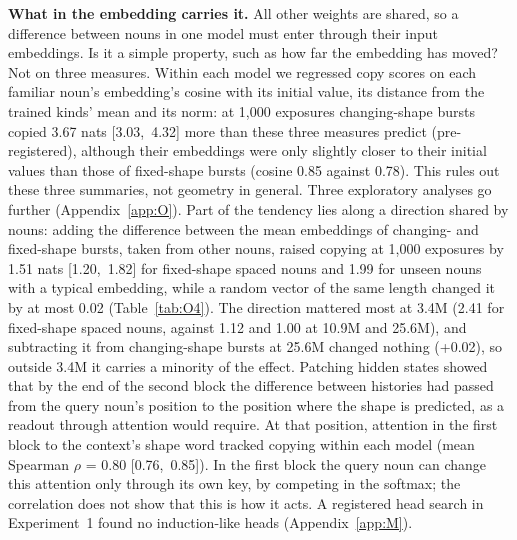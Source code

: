 \documentclass{article}
\begin{document}
\textbf{What in the embedding carries it.} All other weights are shared, so a difference between nouns in one model must enter through their input embeddings. Is it a simple property, such as how far the embedding has moved? Not on three measures. Within each model we regressed copy scores on each familiar noun's embedding's cosine with its initial value, its distance from the trained kinds' mean and its norm: at 1,000 exposures changing-shape bursts copied 3.67 nats [3.03,~4.32] more than these three measures predict (pre-registered), although their embeddings were only slightly closer to their initial values than those of fixed-shape bursts (cosine 0.85 against 0.78). This rules out these three summaries, not geometry in general. Three exploratory analyses go further (Appendix~\ref{app:O}). Part of the tendency lies along a direction shared by nouns: adding the difference between the mean embeddings of changing- and fixed-shape bursts, taken from other nouns, raised copying at 1,000 exposures by 1.51 nats [1.20,~1.82] for fixed-shape spaced nouns and 1.99 for unseen nouns with a typical embedding, while a random vector of the same length changed it by at most 0.02 (Table~\ref{tab:O4}). The direction mattered most at 3.4M (2.41 for fixed-shape spaced nouns, against 1.12 and 1.00 at 10.9M and 25.6M), and subtracting it from changing-shape bursts at 25.6M changed nothing (+0.02), so outside 3.4M it carries a minority of the effect. Patching hidden states \citep{zhang2024patching} showed that by the end of the second block the difference between histories had passed from the query noun's position to the position where the shape is predicted, as a readout through attention would require. At that position, attention in the first block to the context's shape word tracked copying within each model (mean Spearman $\rho$ = 0.80 [0.76,~0.85]). In the first block the query noun can change this attention only through its own key, by competing in the softmax; the correlation does not show that this is how it acts. A registered head search in Experiment~1 found no induction-like heads (Appendix~\ref{app:M}).

\begin{table}[!t]
\centering\small


\caption{Experiment 3, steering (exploratory): copy score with the noun's own embedding (baseline; typical embedding for unseen nouns) and change when the changing-minus-fixed burst direction from other nouns, or a random vector of the same length, is added to the embedding (nats; ten seeds, sizes averaged). Nouns at 1,000 exposures. $^a$Direction from 100-exposure bursts. $^b$Direction from 100-exposure bursts subtracted.}
\label{tab:O4}
\end{table}
\end{document}
